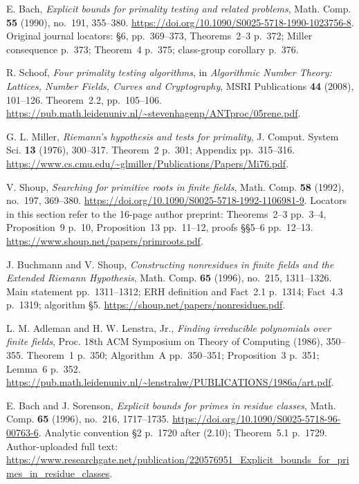 E. Bach, \emph{Explicit bounds for primality testing and related problems},
Math. Comp. \textbf{55} (1990), no.~191, 355--380.
\url{https://doi.org/10.1090/S0025-5718-1990-1023756-8}.
Original journal locators: \S6, pp.~369--373, Theorems~2--3 p.~372;
Miller consequence p.~373; Theorem~4 p.~375; class-group corollary p.~376.

R. Schoof, \emph{Four primality testing algorithms}, in
\emph{Algorithmic Number Theory: Lattices, Number Fields, Curves and Cryptography},
MSRI Publications \textbf{44} (2008), 101--126.
Theorem~2.2, pp.~105--106.
\url{https://pub.math.leidenuniv.nl/~stevenhagenp/ANTproc/05rene.pdf}.

G. L. Miller, \emph{Riemann's hypothesis and tests for primality},
J. Comput. System Sci. \textbf{13} (1976), 300--317.
Theorem~2 p.~301; Appendix pp.~315--316.
\url{https://www.cs.cmu.edu/~glmiller/Publications/Papers/Mi76.pdf}.

V. Shoup, \emph{Searching for primitive roots in finite fields},
Math. Comp. \textbf{58} (1992), no.~197, 369--380.
\url{https://doi.org/10.1090/S0025-5718-1992-1106981-9}.
Locators in this section refer to the 16-page author preprint:
Theorems~2--3 pp.~3--4, Proposition~9 p.~10, Proposition~13 pp.~11--12,
proofs \S\S5--6 pp.~12--13.
\url{https://www.shoup.net/papers/primroots.pdf}.

J. Buchmann and V. Shoup,
\emph{Constructing nonresidues in finite fields and the Extended Riemann Hypothesis},
Math. Comp. \textbf{65} (1996), no.~215, 1311--1326.
Main statement pp.~1311--1312; ERH definition and Fact~2.1 p.~1314;
Fact~4.3 p.~1319; algorithm \S5.
\url{https://shoup.net/papers/nonresidues.pdf}.

L. M. Adleman and H. W. Lenstra, Jr.,
\emph{Finding irreducible polynomials over finite fields},
Proc. 18th ACM Symposium on Theory of Computing (1986), 350--355.
Theorem~1 p.~350; Algorithm~A pp.~350--351; Proposition~3 p.~351;
Lemma~6 p.~352.
\url{https://pub.math.leidenuniv.nl/~lenstrahw/PUBLICATIONS/1986a/art.pdf}.

E. Bach and J. Sorenson, \emph{Explicit bounds for primes in residue classes},
Math. Comp. \textbf{65} (1996), no.~216, 1717--1735.
\url{https://doi.org/10.1090/S0025-5718-96-00763-6}.
Analytic convention \S2 p.~1720 after (2.10);
Theorem~5.1 p.~1729.
Author-uploaded full text:
\url{https://www.researchgate.net/publication/220576951_Explicit_bounds_for_primes_in_residue_classes}.

